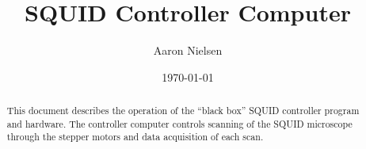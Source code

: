 \documentclass{article}
\title{SQUID Controller Computer}
\author{Aaron Nielsen}
\date{\today}
\begin{document}


\maketitle

\begin{abstract}
This document describes the operation of the ``black box'' SQUID
controller program and hardware. The controller computer controls
scanning of the SQUID microscope through the stepper motors and
data acquisition of each scan.
\end{abstract}






\printindex
\end{document}
